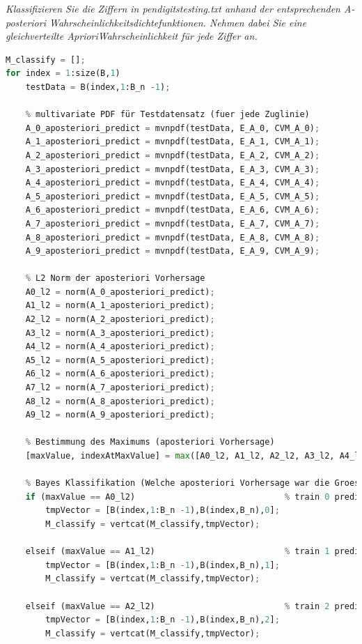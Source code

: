 \documentclass[12pt]{article}
\begin{document}
\textit{Klassifizieren Sie die Ziffern in pendigits­testing.txt​ anhand der entsprechenden A­-posteriori­ Wahrscheinlichkeitsdichtefunktionen. Nehmen dabei Sie eine gleichverteilte A­priori­Wahrscheinlichkeit für jede Ziffer an.}
\begin{lstlisting}[language=Python]
% Klassifizierung der Testdaten (Metrik: L2-Norm)
M_classify = [];
for index = 1:size(B,1)
    testData = B(index,1:B_n -1);
    
    % multivariate PDF für Testdatensatz (fuer jede Zuglinie)
    A_0_aposteriori_predict = mvnpdf(testData, E_A_0, CVM_A_0);
    A_1_aposteriori_predict = mvnpdf(testData, E_A_1, CVM_A_1);
    A_2_aposteriori_predict = mvnpdf(testData, E_A_2, CVM_A_2);
    A_3_aposteriori_predict = mvnpdf(testData, E_A_3, CVM_A_3);
    A_4_aposteriori_predict = mvnpdf(testData, E_A_4, CVM_A_4);
    A_5_aposteriori_predict = mvnpdf(testData, E_A_5, CVM_A_5);
    A_6_aposteriori_predict = mvnpdf(testData, E_A_6, CVM_A_6);
    A_7_aposteriori_predict = mvnpdf(testData, E_A_7, CVM_A_7);
    A_8_aposteriori_predict = mvnpdf(testData, E_A_8, CVM_A_8);
    A_9_aposteriori_predict = mvnpdf(testData, E_A_9, CVM_A_9);
    
    % L2 Norm der aposteriori Vorhersage
    A0_l2 = norm(A_0_aposteriori_predict);
    A1_l2 = norm(A_1_aposteriori_predict);
    A2_l2 = norm(A_2_aposteriori_predict);
    A3_l2 = norm(A_3_aposteriori_predict);
    A4_l2 = norm(A_4_aposteriori_predict);
    A5_l2 = norm(A_5_aposteriori_predict);
    A6_l2 = norm(A_6_aposteriori_predict);
    A7_l2 = norm(A_7_aposteriori_predict);
    A8_l2 = norm(A_8_aposteriori_predict);
    A9_l2 = norm(A_9_aposteriori_predict);
    
    % Bestimmung des Maximums (aposteriori Vorhersage)
    [maxValue, indexAtMaxValue] = max([A0_l2, A1_l2, A2_l2, A3_l2, A4_l2, A5_l2, A6_l2, A7_l2, A8_l2, A9_l2]);
    
    % Bayes Klassifikation (Welche aposteriori Vorhersage war die Groesste?)
    if (maxValue == A0_l2)                              % train 0 predicted
        tmpVector = [B(index,1:B_n -1),B(index,B_n),0];
        M_classify = vertcat(M_classify,tmpVector);
        
    elseif (maxValue == A1_l2)                          % train 1 predicted
        tmpVector = [B(index,1:B_n -1),B(index,B_n),1];
        M_classify = vertcat(M_classify,tmpVector);

    elseif (maxValue == A2_l2)                          % train 2 predicted
        tmpVector = [B(index,1:B_n -1),B(index,B_n),2];
        M_classify = vertcat(M_classify,tmpVector);


\end{lstlisting}
\end{document}
